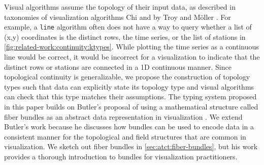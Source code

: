 \documentclass[10pt,journal,compsoc]{IEEEtran}
\theoremstyle{definition}
\theoremstyle{remark}
\begin{document}
Visual algorithms assume the topology of their input data, as described in taxonomies of visualization algorithms Chi\cite{chiTaxonomyVisualizationTechniques2000} and by Troy and M\"{o}ller \cite{toryRethinkingVisualizationHighlevel2004}. For example, a \texttt{line} algorithm often does not have a way to query whether a list of (x,y) coordinates is the distinct rows, the time series, or the list of stations in \autoref{fig:related-work:continuity:ktypes}. While plotting the time series as a continuous line would be correct, it would be incorrect for a visualization to indicate that the distinct rows or stations are connected in a 1D continuous manner. Since topological continuity is generalizable, we propose the construction of topology types such that data can explicitly state its topology type and visual algorithms can check that this type matches their assumptions. The typing system proposed in this paper builds on Butler's proposal of using a mathematical structure called fiber bundles as an abstract data representation in visualization \cite{butlerVectorBundleClassesForm1992, butlerVisualizationModelBased1989}. We extend Butler's work because he discusses how bundles can be used to encode data in a consistent manner for the topological and field structures that are common in visualization. We sketch out fiber bundles in \autoref{sec:atct:fiber-bundles}, but his work provides a thorough introduction to bundles for visualization practitioners. 
\end{document}
